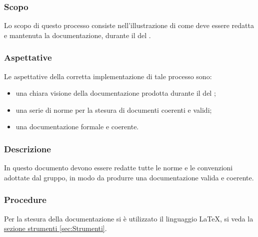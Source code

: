 \subsubsection{Scopo}
Lo scopo di questo processo consiste nell'illustrazione di come deve essere redatta e mantenuta
la documentazione, durante il  del .
\subsubsection{Aspettative}
Le aspettative della corretta implementazione di tale processo sono:
\begin{itemize}
	\item una chiara visione della documentazione prodotta durante il 
del ;
	\item una serie di norme per la stesura di documenti coerenti e validi;
	\item una documentazione formale e coerente.
\end{itemize}
\subsubsection{Descrizione}
In questo documento devono essere redatte tutte le norme e le convenzioni adottate dal gruppo,
in modo da produrre una documentazione valida e coerente.
\subsubsection{Procedure}
Per la stesura della documentazione si è utilizzato il linguaggio \LaTeX{}, si veda la \hyperref[sec:Strumenti]{sezione strumenti \ref*{sec:Strumenti}}.
